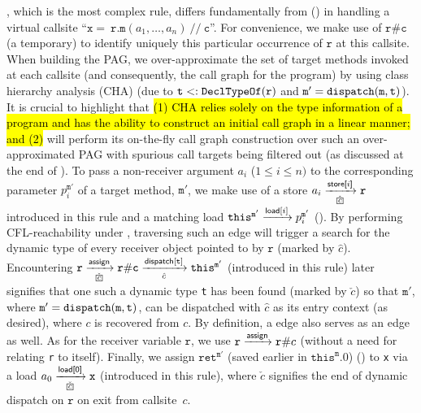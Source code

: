  
 
, which is the most complex rule, differs fundamentally from  () in
handling
a virtual callsite 
``$\mathtt{x = } ~ \mathtt{r}.\mathtt{m}(a_1, \dots, a_n) ~ \mathtt{//~ c}$''. For
convenience,
we make use of $\mathtt{r}\#\texttt{c}$ (a temporary) to identify uniquely this particular
occurrence of
 $\mathtt{r}$ at this callsite. When building the PAG, we over-approximate the
set of target methods invoked at each callsite  (and consequently, the call graph for the
program) by using class hierarchy analysis
(CHA) \cite{dean1995optimization} (due to $\texttt{t} <: \texttt{DeclTypeOf}(\mathtt{r})$ and
$ \mathtt{m'} = \texttt{dispatch}(\texttt{m}, \texttt{t}) $). It is crucial to highlight
that \hl{(1) CHA relies solely on the type information of a program and has the ability to construct an initial call graph in a linear manner; and  (2)} \LFCR will perform its on-the-fly call graph construction
over such an over-approximated PAG with spurious call targets being 
filtered out (as discussed at the end of 
). To pass a 
non-receiver  argument  
$a_i$ ($1\leqslant i \leqslant n)$ to
the corresponding  parameter $p_i^{\mathtt{m'}}$ 
of a target method, $\mathtt{m'}$, we make use of a  store
$ a_i \xrightarrow[\hat{\boxed{c}}]{\storefield{$i$}} \mathtt{r}$ introduced in this rule 
 and  a matching load
 $\mathtt{this}^{\texttt{m}'} \xrightarrow{\textsf{load}[i]} p_{i}^{\texttt{m}'}$
 ().
 By performing CFL-reachability
under \LFCR, 
traversing such an edge will trigger a search
for the dynamic type of
every receiver object pointed to by $\mathtt{r}$ (marked by
$\hat{\boxed{c}}$). Encountering 
$\mathtt{r} \xrightarrow[\check{\boxed{c}}]{\assign} 
\mathtt{r}\#\texttt{c} \xrightarrow[\hat{c}]{\indispatch[\texttt{t}]} \texttt{this}^{\mathtt{m'}} 
$
(introduced in this rule) later signifies that one such a dynamic type \texttt{t} has been found (marked by 
$\check{\boxed{c}}$) so that $\mathtt{m'}$, where $\mathtt{m'} = \texttt{dispatch}(\texttt{m}, \texttt{t})$,
  can be dispatched with $\hat{c}$ as its entry context (as desired), where $c$ is recovered from $\boxed{c}$. By definition, a  edge  also serves as an
  \assign edge as well.
  As for the receiver variable $\mathtt{r}$, we 
use  $\mathtt{r} \xrightarrow{\textsf{assign}} \mathtt{r}\#c$ (without a need for relating
\texttt{r} to 
itself).
Finally, we assign $\mathtt{ret}^{\mathtt{m'}}$ (saved earlier in $\texttt{this}^\texttt{m}.0$)  () 
to \texttt{x} via a load
 $a_0 \xrightarrow[\check{\boxed{c}}]{\loadfield{\ret}} \mathtt{x}$ (introduced in this rule),
 where $\check{\boxed{c}}$ signifies the end of dynamic dispatch on $\mathtt{r}$ on exit
 from  callsite~$c$.

